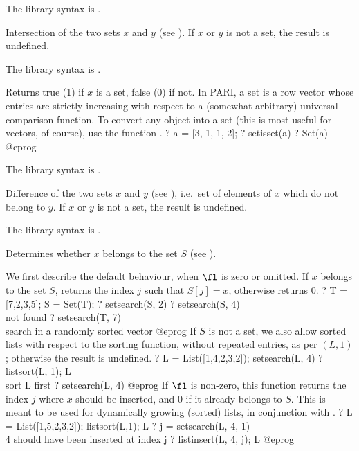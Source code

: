 The library syntax is .

\label{se:setintersect}
Intersection of the two sets $x$ and $y$ (see ).
If $x$ or $y$ is not a set, the result is undefined.

The library syntax is .

\label{se:setisset}
Returns true (1) if $x$ is a set, false (0) if
not. In PARI, a set is a row vector whose entries are strictly
increasing with respect to a (somewhat arbitrary) universal comparison
function. To convert any object into a set (this is most useful for
vectors, of course), use the function .
\bprog
? a = [3, 1, 1, 2];
? setisset(a)
? Set(a)
@eprog

The library syntax is .

\label{se:setminus}
Difference of the two sets $x$ and $y$ (see ),
i.e.~set of elements of $x$ which do not belong to $y$.
If $x$ or $y$ is not a set, the result is undefined.

The library syntax is .

\label{se:setsearch}
Determines whether $x$ belongs to the set $S$ (see ).

We first describe the default behaviour, when $\fl$ is zero or omitted. If $x$
belongs to the set $S$, returns the index $j$ such that $S[j]=x$, otherwise
returns 0.
\bprog
? T = [7,2,3,5]; S = Set(T);
? setsearch(S, 2)
? setsearch(S, 4)      \\ not found
? setsearch(T, 7)      \\ search in a randomly sorted vector
@eprog\noindent
If $S$ is not a set, we also allow sorted lists with
respect to the  sorting function, without repeated entries,
as per $(L,1)$; otherwise the result is undefined.
\bprog
? L = List([1,4,2,3,2]); setsearch(L, 4)
? listsort(L, 1); L    \\ sort L first
? setsearch(L, 4)
@eprog\noindent
If $\fl$ is non-zero, this function returns the index $j$ where $x$ should be
inserted, and $0$ if it already belongs to $S$. This is meant to be used for
dynamically growing (sorted) lists, in conjunction with .
\bprog
? L = List([1,5,2,3,2]); listsort(L,1); L
? j = setsearch(L, 4, 1)  \\ 4 should have been inserted at index j
? listinsert(L, 4, j); L
@eprog

